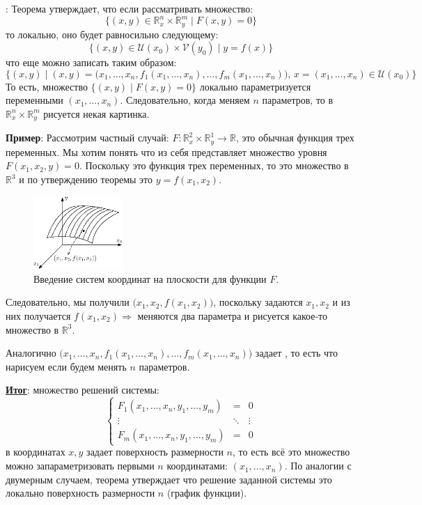 \documentclass[12pt]{article}
\newcommand{\MR}{\mathbb{R}}
\newcommand{\MU}{\mathcal{U}}
\newcommand{\MV}{\mathcal{V}}
\theoremstyle{definition}
\begin{document}
\textbf{}: Теорема утверждает, что если рассматривать множество:
$$
	\{(x,y) \in \MR_x^n \times \MR_y^m \mid F(x,y)= 0\}
$$
то локально, оно будет равносильно следующему:
$$
	\{(x,y) \in \MU(x_0) \times \MV(y_0) \mid y = f(x) \}
$$
что еще можно записать таким образом:
$$
	\big\{(x,y) \mid (x,y) = \big(x_1, \dotsc, x_n, f_1(x_1, \dotsc, x_n), \dotsc, f_m(x_1,\dotsc, x_n)\big), \, x = (x_1, \dotsc, x_n) \in \MU(x_0) \big\}
$$
То есть, множество $\{(x,y) \mid F(x,y)=0\}$ локально параметризуется переменными $(x_1, \dotsc, x_n)$. Следовательно, когда меняем $n$ параметров, то в $\MR_x^n \times \MR_y^m$ рисуется некая картинка.

\textbf{Пример}: Рассмотрим частный случай: $F \colon \MR_x^2 \times \MR_y^1 \to \MR$, это обычная функция трех переменных. Мы хотим понять что из себя представляет множество уровня $F(x_1, x_2, y) = 0$. Поскольку это функция трех переменных, то это множество в $\MR^3$ и по утверждению теоремы это $y = f(x_1, x_2)$.
\begin{figure}[H]
	\centering
	\includegraphics[width=0.3\textwidth]{16_8.eps}
	\caption{Введение систем координат на плоскости для функции $F$.}
	\label{16_8}
\end{figure}
Следовательно, мы получили  $\big(x_1,x_2,f(x_1,x_2)\big)$, поскольку задаются $x_1, x_2$ и из них получается $f(x_1,x_2) \Rightarrow$ меняются два параметра и рисуется какое-то множество в $\MR^3$. 

Аналогично $\big(x_1, \dotsc, x_n, f_1(x_1, \dotsc, x_n), \dotsc, f_m(x_1,\dotsc, x_n)\big)$ задает , то есть что нарисуем если будем менять $n$ параметров.

\textbf{\uline{Итог}}: множество решений системы:
$$
	\left\{
	\begin{array}{ccc}
		F_1(x_1, \dotsc, x_n, y_1, \dotsc, y_m) & = &  0 \\
		\vdots & \ddots & \vdots \\
		F_m(x_1, \dotsc, x_n, y_1, \dotsc, y_m) & = &  0 
	\end{array}
	\right.
$$
в координатах $x,y$ задает поверхность размерности $n$, то есть всё это множество можно запараметризовать первыми $n$ координатами: $(x_1, \dotsc, x_n)$. По аналогии с двумерным случаем, теорема утверждает что решение заданной системы это локально поверхность размерности $n$ (график функции).
\end{document}

